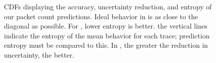 \documentclass[conference]{IEEEtran}
\begin{document}
\begin{figure}[!t]
\vspace{-1em}
\begin{center}
\caption{%
CDFs displaying the accuracy, uncertainty reduction, and entropy of our packet count predictions.
Ideal behavior in  is as close to the diagonal as possible.
For , lower entropy is better.
the vertical lines indicate the entropy of the mean behavior for each trace;
prediction entropy must be compared to this.
In , the greater the reduction in uncertainty, the better.
}
\end{center}
\vspace{-2em}
\end{figure}
\end{document}
